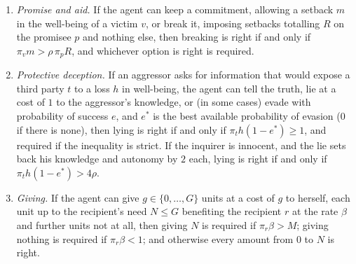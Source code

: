 \documentclass{situationist-preprint}
\begin{document}
\begin{proposition}[Thresholds]\label{p:thresholds}
\begin{enumerate}[label=(\alph*)]
\item \emph{Promise and aid.} If the agent can keep a commitment, allowing a setback $m$ in the well-being of a victim $v$, or break it, imposing setbacks totalling $R$ on the promisee $p$ and nothing else, then breaking is right if and only if $\pi_v m>\rho\,\pi_p R$, and whichever option is right is required.
\item \emph{Protective deception.} If an aggressor asks for information that would expose a third party $t$ to a loss $h$ in well-being, the agent can tell the truth, lie at a cost of $1$ to the aggressor's knowledge, or (in some cases) evade with probability of success $e$, and $e^\ast$ is the best available probability of evasion ($0$ if there is none), then lying is right if and only if $\pi_t h(1-e^\ast)\geq 1$, and required if the inequality is strict. If the inquirer is innocent, and the lie sets back his knowledge and autonomy by $2$ each, lying is right if and only if $\pi_t h(1-e^\ast)>4\rho$.
\item \emph{Giving.} If the agent can give $g\in\{0,\dots,G\}$ units at a cost of $g$ to herself, each unit up to the recipient's need $N\leq G$ benefiting the recipient $r$ at the rate $\beta$ and further units not at all, then giving $N$ is required if $\pi_r\beta>M$; giving nothing is required if $\pi_r\beta<1$; and otherwise every amount from $0$ to $N$ is right.
\end{enumerate}
\end{proposition}
\end{document}
